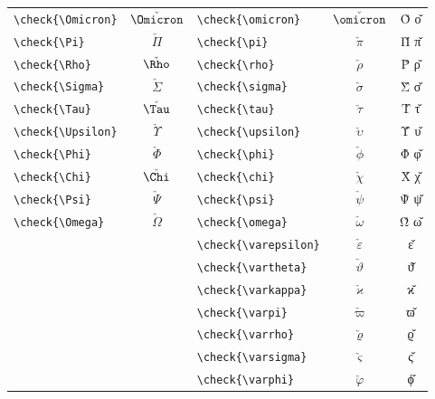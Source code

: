 \documentclass[12pt,a4paper]{article}
\begin{document}
\begin{longtable}{|l|c|l|c|c|}
\verb|\check{\Omicron}|    & $\check{\Omicron}$ & \verb|\check{\omicron}|    & $\check{\omicron}$    & Ο̌ ο̌ \\
\verb|\check{\Pi}|         & $\check{\Pi}$      & \verb|\check{\pi}|         & $\check{\pi}$         & Π̌ π̌ \\
\verb|\check{\Rho}|        & $\check{\Rho}$     & \verb|\check{\rho}|        & $\check{\rho}$        & Ρ̌ ρ̌ \\
\verb|\check{\Sigma}|      & $\check{\Sigma}$   & \verb|\check{\sigma}|      & $\check{\sigma}$      & Σ̌ σ̌ \\
\verb|\check{\Tau}|        & $\check{\Tau}$     & \verb|\check{\tau}|        & $\check{\tau}$        & Τ̌ τ̌ \\
\verb|\check{\Upsilon}|    & $\check{\Upsilon}$ & \verb|\check{\upsilon}|    & $\check{\upsilon}$    & Υ̌ υ̌ \\
\verb|\check{\Phi}|        & $\check{\Phi}$     & \verb|\check{\phi}|        & $\check{\phi}$        & Φ̌ φ̌ \\
\verb|\check{\Chi}|        & $\check{\Chi}$     & \verb|\check{\chi}|        & $\check{\chi}$        & Χ̌ χ̌ \\
\verb|\check{\Psi}|        & $\check{\Psi}$     & \verb|\check{\psi}|        & $\check{\psi}$        & Ψ̌ ψ̌ \\
\verb|\check{\Omega}|      & $\check{\Omega}$   & \verb|\check{\omega}|      & $\check{\omega}$      & Ω̌ ω̌ \\
                           &                    & \verb|\check{\varepsilon}| & $\check{\varepsilon}$ & ε̌ \\
                           &                    & \verb|\check{\vartheta}|   & $\check{\vartheta}$   & ϑ̌ \\
                           &                    & \verb|\check{\varkappa}|   & $\check{\varkappa}$   & ϰ̌ \\
                           &                    & \verb|\check{\varpi}|      & $\check{\varpi}$      & ϖ̌ \\
                           &                    & \verb|\check{\varrho}|     & $\check{\varrho}$     & ϱ̌ \\
                           &                    & \verb|\check{\varsigma}|   & $\check{\varsigma}$   & ς̌ \\
                           &                    & \verb|\check{\varphi}|     & $\check{\varphi}$     & ϕ̌ \\
\hline
\end{longtable}
\end{document}

